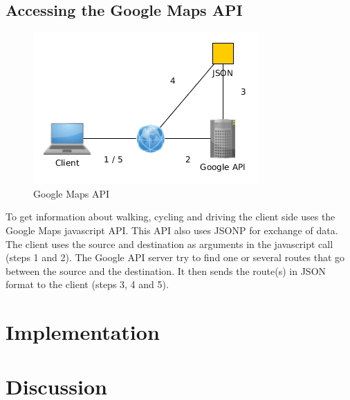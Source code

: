 \documentclass[10pt,a4paper]{article}
\begin{document}
\subsection{Accessing the Google Maps API}
\begin{figure}
\centering
\includegraphics[width=\textwidth]{../google/access}
\caption{Google Maps API}
\label{fig:google}
\end{figure}
To get information about walking, cycling and driving the client side uses the Google Maps javascript API. This API also uses JSONP for exchange of data. The client uses the source and destination as arguments in the javascript call (steps 1 and 2). The Google API server try to find one or several routes that go between the source and the destination. It then sends the route(s) in JSON format to the client (steps 3, 4 and 5).



\section{Implementation}

\section{Discussion}
\end{document}

